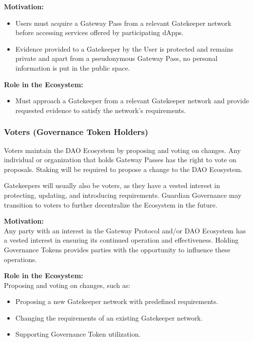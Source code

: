\vspace{1em}

\textbf{Motivation:}
\begin{itemize}
\item Users must acquire a Gateway Pass from a relevant Gatekeeper network before accessing services offered by participating dApps.
\item Evidence provided to a Gatekeeper by the User is protected and remains private and apart from a pseudonymous Gateway Pass, no personal information is put in the public space.
\end{itemize}

\textbf{Role in the Ecosystem:}
\begin{itemize}
\item Must approach a Gatekeeper from a relevant Gatekeeper network and provide requested evidence to satisfy the network’s requirements.
\end{itemize}

\subsubsection{Voters (Governance Token Holders)}
Voters maintain the DAO Ecosystem by proposing and voting on changes. Any individual or organization that holds Gateway Passes has the right to vote on proposals. Staking will be required to propose a change to the DAO Ecosystem.

Gatekeepers will usually also be voters, as they have a vested interest in protecting, updating, and introducing requirements. Guardian Governance may transition to voters to further decentralize the Ecosystem in the future.

\vspace{1em}

\textbf{Motivation:}\\
Any party with an interest in the Gateway Protocol and/or DAO Ecosystem has a vested interest in ensuring its continued operation and effectiveness. Holding Governance Tokens provides parties with the opportunity to influence these operations.

\vspace{1em}

\textbf{Role in the Ecosystem:}\\
Proposing and voting on changes, such as:
\begin{itemize}
\item Proposing a new Gatekeeper network with predefined requirements.
\item Changing the requirements of an existing Gatekeeper network.
\item Supporting Governance Token utilization.
\end{itemize}

